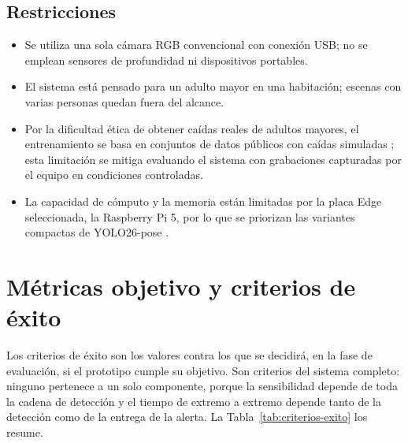 \documentclass[12pt,a4paper,oneside]{book}
\theoremstyle{plain}
\theoremstyle{definition}
\theoremstyle{remark}
\begin{document}
\subsection{Restricciones}

\begin{itemize}
  \item Se utiliza una sola cámara RGB convencional con conexión USB; no se emplean sensores de profundidad ni dispositivos portables.
  \item El sistema está pensado para un adulto mayor en una habitación; escenas con varias personas quedan fuera del alcance.
  \item Por la dificultad ética de obtener caídas reales de adultos mayores, el entrenamiento se basa en conjuntos de datos públicos con caídas simuladas \parencite{igual2013challenges,alam2022review}; esta limitación se mitiga evaluando el sistema con grabaciones capturadas por el equipo en condiciones controladas.
  \item La capacidad de cómputo y la memoria están limitadas por la placa Edge seleccionada, la Raspberry Pi 5, por lo que se priorizan las variantes compactas de YOLO26-pose \parencite{ultralytics2026yolo26}.
\end{itemize}

\section{Métricas objetivo y criterios de éxito}
\label{sec:criterios-exito}

Los criterios de éxito son los valores contra los que se decidirá, en la fase de evaluación, si el prototipo cumple su objetivo. Son criterios del sistema completo: ninguno pertenece a un solo componente, porque la sensibilidad depende de toda la cadena de detección y el tiempo de extremo a extremo depende tanto de la detección como de la entrega de la alerta. La Tabla~\ref{tab:criterios-exito} los resume.
\end{document}
